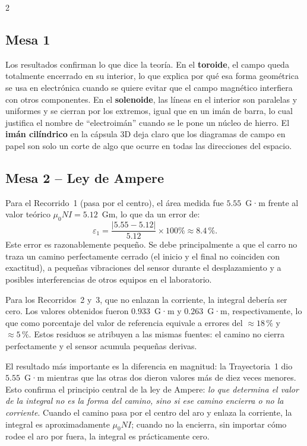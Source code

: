 \documentclass[10pt]{article}
\begin{document}
\begin{multicols}{2}
\subsection*{Mesa 1}

Los resultados confirman lo que dice la teoría. En el \textbf{toroide}, el campo queda totalmente encerrado en su interior, lo que explica por qué esa forma geométrica se usa en electrónica cuando se quiere evitar que el campo magnético interfiera con otros componentes. En el \textbf{solenoide}, las líneas en el interior son paralelas y uniformes y se cierran por los extremos, igual que en un imán de barra, lo cual justifica el nombre de ``electroimán'' cuando se le pone un núcleo de hierro. El \textbf{imán cilíndrico} en la cápsula 3D deja claro que los diagramas de campo en papel son solo un corte de algo que ocurre en todas las direcciones del espacio.

\subsection*{Mesa 2 – Ley de Ampere}

Para el Recorrido~1 (pasa por el centro), el área medida fue $5.55$~G·m frente al valor teórico $\mu_0 NI = 5.12$~Gm, lo que da un error de:
\begin{equation}
    \varepsilon_1 = \frac{|5.55 - 5.12|}{5.12}\times 100\% \approx 8.4\,\%.
\end{equation}
Este error es razonablemente pequeño. Se debe principalmente a que el carro no traza un camino perfectamente cerrado (el inicio y el final no coinciden con exactitud), a pequeñas vibraciones del sensor durante el desplazamiento y a posibles interferencias de otros equipos en el laboratorio.

Para los Recorridos~2 y~3, que no enlazan la corriente, la integral debería ser cero. Los valores obtenidos fueron $0.933$~G·m y $0.263$~G·m, respectivamente, lo que como porcentaje del valor de referencia equivale a errores del $\approx18\,\%$ y $\approx5\,\%$. Estos residuos se atribuyen a las mismas fuentes: el camino no cierra perfectamente y el sensor acumula pequeñas derivas.

El resultado más importante es la diferencia en magnitud: la Trayectoria~1 dio $5.55$~G·m mientras que las otras dos dieron valores más de diez veces menores. Esto confirma el principio central de la ley de Ampere: \emph{lo que determina el valor de la integral no es la forma del camino, sino si ese camino encierra o no la corriente}. Cuando el camino pasa por el centro del aro y enlaza la corriente, la integral es aproximadamente $\mu_0 NI$; cuando no la encierra, sin importar cómo rodee el aro por fuera, la integral es prácticamente cero.


\end{multicols}
\end{document}
